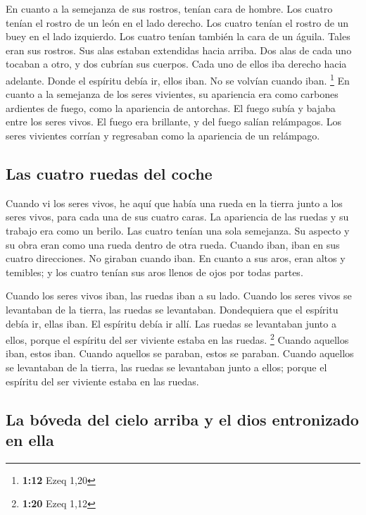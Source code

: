 \begin{paracol}{2}
 En cuanto a la semejanza de sus rostros, tenían cara de
hombre. Los cuatro tenían el rostro de un león en el lado derecho. Los
cuatro tenían el rostro de un buey en el lado izquierdo. Los cuatro
tenían también la cara de un águila.  Tales eran sus
rostros. Sus alas estaban extendidas hacia arriba. Dos alas de cada uno
tocaban a otro, y dos cubrían sus cuerpos.  Cada uno de
ellos iba derecho hacia adelante. Donde el espíritu debía ir, ellos
iban. No se volvían cuando iban. \footnote{\textbf{1:12} Ezeq 1,20}
 En cuanto a la semejanza de los seres vivientes, su
apariencia era como carbones ardientes de fuego, como la apariencia de
antorchas. El fuego subía y bajaba entre los seres vivos. El fuego era
brillante, y del fuego salían relámpagos.  Los seres
vivientes corrían y regresaban como la apariencia de un relámpago.

\hypertarget{las-cuatro-ruedas-del-coche}{%
\subsection{Las cuatro ruedas del
coche}\label{las-cuatro-ruedas-del-coche}}

 Cuando vi los seres vivos, he aquí que había una rueda
en la tierra junto a los seres vivos, para cada una de sus cuatro caras.
 La apariencia de las ruedas y su trabajo era como un
berilo. Las cuatro tenían una sola semejanza. Su aspecto y su obra eran
como una rueda dentro de otra rueda.  Cuando iban, iban
en sus cuatro direcciones. No giraban cuando iban.  En
cuanto a sus aros, eran altos y temibles; y los cuatro tenían sus aros
llenos de ojos por todas partes.

 Cuando los seres vivos iban, las ruedas iban a su lado.
Cuando los seres vivos se levantaban de la tierra, las ruedas se
levantaban.  Dondequiera que el espíritu debía ir, ellas
iban. El espíritu debía ir allí. Las ruedas se levantaban junto a ellos,
porque el espíritu del ser viviente estaba en las ruedas. \footnote{\textbf{1:20}
  Ezeq 1,12}  Cuando aquellos iban, estos iban. Cuando
aquellos se paraban, estos se paraban. Cuando aquellos se levantaban de
la tierra, las ruedas se levantaban junto a ellos; porque el espíritu
del ser viviente estaba en las ruedas.

\hypertarget{la-buxf3veda-del-cielo-arriba-y-el-dios-entronizado-en-ella}{%
\subsection{La bóveda del cielo arriba y el dios entronizado en
ella}\label{la-buxf3veda-del-cielo-arriba-y-el-dios-entronizado-en-ella}}


\end{paracol}

